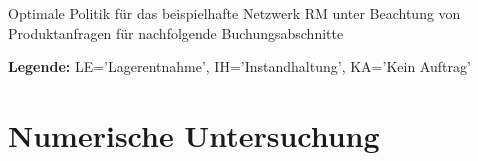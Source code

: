 \begin{table}
\begin{footnotesize}
     \caption{Optimale Politik für das beispielhafte Netzwerk RM unter Beachtung von Produktanfragen für nachfolgende Buchungsabschnitte} \label{Tab10}
    \vspace*{3mm}
        \begin{center}
      \end{center}
    \begin{center}
      {\footnotesize \textbf{Legende:} LE='Lagerentnahme', IH='Instandhaltung', KA='Kein Auftrag'} 
      \end{center}
\end{footnotesize}
\end{table}

\section{Numerische Untersuchung}\label{Untersuchung}